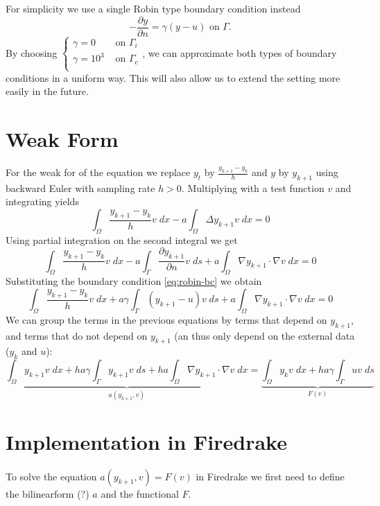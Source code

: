 \documentclass[
12pt, %
a4paper, %
onecolumn, %
portrait %
]{article}
\begin{document}
For simplicity we use a single Robin type boundary condition instead
\begin{equation}
- \frac{\partial y}{\partial n} = \gamma (y - u) \text{ on } \Gamma.
\label{eq:robin-bc}
\end{equation}
By choosing 
$\begin{cases}
 \gamma = 0 &\text{ on } \Gamma_i \\ 
\gamma = 10^{3} &\text{ on } \Gamma_c \\
\end{cases}
$,
we can approximate both types of boundary conditions in a uniform way.
This will also allow us to extend the setting more easily in the future.
\section{Weak Form}
For the weak for of the equation we replace $y_t$ by $\frac{y_{k+1} - y_k}{h}$ and $y$ by $y_{k+1}$ using backward Euler with sampling rate $h > 0$. Multiplying with a test function $v$ and integrating yields
\begin{equation}
\int_{\Omega} \frac{y_{k+1} - y_k}{h} v \; dx - a \int_{\Omega} \Delta y_{k+1} v \; dx = 0
\end{equation}
Using partial integration on the second integral we get
\begin{equation}
\int_{\Omega} \frac{y_{k+1} - y_k}{h} v \; dx - a \int_{\Gamma} \frac{\partial y_{k+1}}{\partial n} v \; ds + a \int_{\Omega} \nabla y_{k+1} \cdot \nabla v \; dx = 0
\end{equation}
Substituting the boundary condition \eqref{eq:robin-bc} we obtain
\begin{equation}
\int_{\Omega} \frac{y_{k+1} - y_k}{h} v \; dx + a \gamma \int_{\Gamma}  (y_{k+1} - u) v \; ds + a \int_{\Omega} \nabla y_{k+1} \cdot \nabla v \; dx = 0
\end{equation}
We can group the terms in the previous equations by terms that depend on $y_{k+1}$, and terms that do not depend on $y_{k+1}$ (an thus only depend on the external data ($y_k$ and $u$):
\begin{equation}
\underbrace{
\int_{\Omega} y_{k+1} v \; dx + h a \gamma \int_{\Gamma} y_{k+1} v \; ds + h a \int_{\Omega} \nabla y_{k+1} \cdot \nabla v \; dx
}_{a(y_{k+1}, v)}
 = 
\underbrace{ 
\int_{\Omega} y_k v \; dx + h a \gamma \int_{\Gamma} u v \; ds
}_{F(v)}
\end{equation}

\section{Implementation in Firedrake}
To solve the equation $a(y_{k+1}, v) = F(v)$ in Firedrake we first need to define the bilinearform (?) $a$ and the functional $F$.
\end{document}
